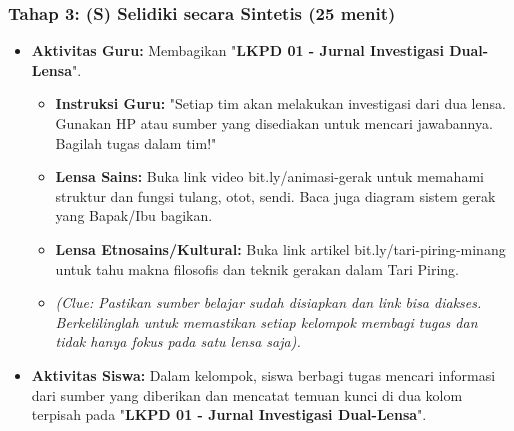 \documentclass[a4paper,12pt]{article}
\begin{document}
\subsubsection{Tahap 3: (S) Selidiki secara Sintetis (25 menit)}
\begin{itemize}
\item \textbf{Aktivitas Guru:} Membagikan "\textbf{LKPD 01 - Jurnal Investigasi Dual-Lensa}".
    \begin{itemize}
    \item \textbf{Instruksi Guru:} "Setiap tim akan melakukan investigasi dari dua lensa. Gunakan HP atau sumber yang disediakan untuk mencari jawabannya. Bagilah tugas dalam tim!"
    \item \textbf{Lensa Sains:} Buka link video bit.ly/animasi-gerak untuk memahami struktur dan fungsi tulang, otot, sendi. Baca juga diagram sistem gerak yang Bapak/Ibu bagikan.
    \item \textbf{Lensa Etnosains/Kultural:} Buka link artikel bit.ly/tari-piring-minang untuk tahu makna filosofis dan teknik gerakan dalam Tari Piring.
    \item \textit{(Clue: Pastikan sumber belajar sudah disiapkan dan link bisa diakses. Berkelilinglah untuk memastikan setiap kelompok membagi tugas dan tidak hanya fokus pada satu lensa saja).}
    \end{itemize}
\item \textbf{Aktivitas Siswa:} Dalam kelompok, siswa berbagi tugas mencari informasi dari sumber yang diberikan dan mencatat temuan kunci di dua kolom terpisah pada "\textbf{LKPD 01 - Jurnal Investigasi Dual-Lensa}".
\end{itemize}
\end{document}
